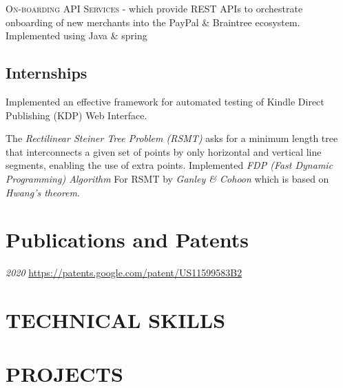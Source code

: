 \documentclass[11pt, a4paper, sans]{moderncv}
\begin{document}
{\textsc{On-boarding API Services} - which provide REST APIs to orchestrate onboarding of new merchants into the PayPal \& Braintree ecosystem. Implemented using Java \& spring \newline} 

\subsection{Internships}
{Implemented an effective framework for automated testing of Kindle Direct Publishing (KDP) Web Interface.}

{The \textit{Rectilinear Steiner Tree Problem (RSMT)} asks for a minimum length tree that interconnects a given set of points by only horizontal and vertical line segments, enabling the use of extra points. Implemented \textit{ FDP (Fast Dynamic Programming) Algorithm } For RSMT by \textit{ Ganley \& Cohoon } which is based on \textit{ Hwang’s theorem}}.

\section{Publications and Patents}
{\hfill \textit{2020}}
{\newline \url{https://patents.google.com/patent/US11599583B2}}


\section{TECHNICAL SKILLS}

\section{PROJECTS}
\end{document}
